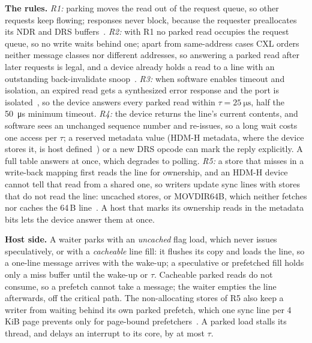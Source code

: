 \documentclass[journal]{IEEEtran}
\begin{document}
\textbf{The rules.} \emph{R1:} parking moves the read out of the request queue, so other requests
keep flowing; responses never block, because the requester preallocates its NDR and DRS
buffers~\cite{cxl3}. \emph{R2:} with R1 no parked read occupies the request queue, so no write
waits behind one; apart from same-address cases CXL orders neither message classes nor
different addresses, so answering a parked read after later requests is legal, and a device already holds a
read to a line with an outstanding back-invalidate snoop~\cite{cxl3,ergin_bi}. \emph{R3:} when software
enables timeout and isolation, an expired read gets a synthesized error response and the port is
isolated~\cite{cxl32}, so the device answers every parked read within $\tau=\SI{25}{\micro\second}$, half the
\SI{50}{\micro\second} minimum timeout.
\emph{R4:} the device returns the line's current contents, and software sees an unchanged sequence
number and re-issues, so a long wait costs one access per $\tau$; a reserved metadata value (HDM-H
metadata, where the device stores it, is host defined~\cite{cxl32}) or a new DRS opcode can mark the
reply explicitly. A full table answers at once, which degrades to polling. \emph{R5:} a store that
misses in a write-back mapping first reads the line for ownership, and an HDM-H device cannot tell
that read from a shared one, so writers update sync lines with stores that do not read the line:
uncached stores, or MOVDIR64B, which neither fetches nor caches the 64\,B line~\cite{intelsdm}. A
host that marks its ownership reads in the metadata bits lets the device answer them at once.

\textbf{Host side.} A waiter parks with an \emph{uncached} flag load, which never issues
speculatively, or with a \emph{cacheable} line fill: it flushes its copy and loads the line, so a
one-line message arrives with the wake-up; a speculative or prefetched fill holds only a miss buffer
until the wake-up or $\tau$. Cacheable parked reads do not consume, so a prefetch cannot take a
message; the waiter empties the line afterwards, off the critical path. The non-allocating stores of R5 also keep a writer from waiting behind its own parked
prefetch, which one sync line per 4\,KiB page prevents only for page-bound prefetchers~\cite{intelopt}. A parked load stalls its thread, and delays an
interrupt to its core, by at most $\tau$.
\end{document}
